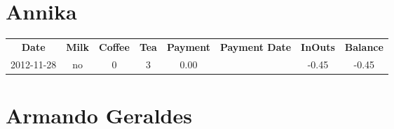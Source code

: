 \section{Annika}

\begin{center}
\begin{tabular}{cccccccc}
\textbf{Date} & \textbf{Milk} & \textbf{Coffee} & \textbf{Tea} & \textbf{Payment} & \textbf{Payment Date} & \textbf{InOuts} & \textbf{Balance} \\
2012-11-28 & no & 0 & 3 & 0.00 &  & -0.45 & -0.45
\end{tabular}
\end{center}

\section{Armando Geraldes}

